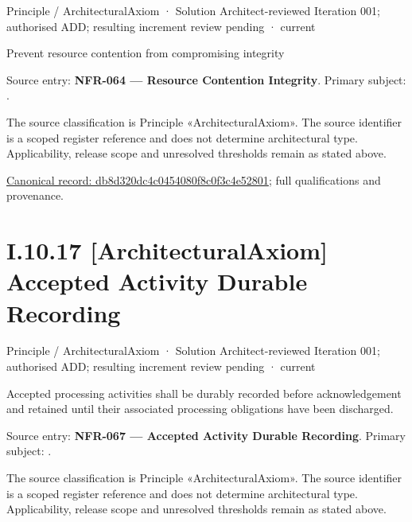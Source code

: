 \label{element:db8d320dc4c0454080f8c0f3c4e52801}
{\small Principle / ArchitecturalAxiom · Solution Architect-reviewed Iteration 001; authorised ADD; resulting increment review pending · current}\par

Prevent resource contention from compromising integrity



Source entry: \textbf{NFR-064 — Resource Contention Integrity}. Primary subject: \texttt{}.



The source classification is Principle «ArchitecturalAxiom». The source identifier is a scoped register reference and does not determine architectural type. Applicability, release scope and unresolved thresholds remain as stated above.


{\footnotesize \href{../../../../../../../continuum/motivation/principle/architectural-axiom/db8d320dc4c0454080f8c0f3c4e52801.md}{Canonical record: db8d320dc4c0454080f8c0f3c4e52801}; full qualifications and provenance.}\par
\section*{I.10.17 [ArchitecturalAxiom] Accepted Activity Durable Recording}
\label{navigation:I.10.17}

\label{element:6ee491b8c08d41868c3a7652fb794756}
{\small Principle / ArchitecturalAxiom · Solution Architect-reviewed Iteration 001; authorised ADD; resulting increment review pending · current}\par

Accepted processing activities shall be durably recorded before acknowledgement and retained until their associated processing obligations have been discharged.



Source entry: \textbf{NFR-067 — Accepted Activity Durable Recording}. Primary subject: \texttt{}.



The source classification is Principle «ArchitecturalAxiom». The source identifier is a scoped register reference and does not determine architectural type. Applicability, release scope and unresolved thresholds remain as stated above.


